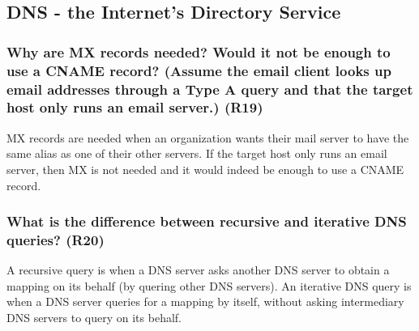 \subsection{DNS - the Internet's Directory Service}


\subsubsection{Why are MX records needed? Would it not be enough to use a CNAME record? (Assume the email client looks up email addresses through a Type A query and that the target host only runs an email server.) (R19)}

MX records are needed when an organization wants their mail server to have the same alias as one of their other servers. If the target host only runs an email server, then MX is not needed and it would indeed be enough to use a CNAME record.


\subsubsection{What is the difference between recursive and iterative DNS queries? (R20)}

A recursive query is when a DNS server asks another DNS server to obtain a mapping on its behalf (by quering other DNS servers). An iterative DNS query is when a DNS server queries for a mapping by itself, without asking intermediary DNS servers to query on its behalf.
